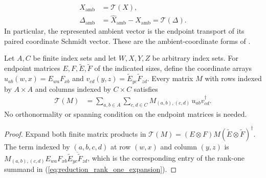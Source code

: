 \begin{definition}
\begin{align}
        X_{\mathrm{amb}} & =\mathcal T(X),
        \label{eq:reduction_ambient_exact}                                                      \\
        \Delta_{\mathrm{amb}}
                         & =\widehat X_{\mathrm{amb}}-X_{\mathrm{amb}}=\mathcal T(\Delta).
        \label{eq:reduction_ambient_correction}
    \end{align}
    In particular, the represented ambient vector is the endpoint
    transport of its paired coordinate Schmidt vector.
    These are the ambient-coordinate forms of
    \cite[Equation~(5.6)]{OpenAI2026PolynomialPEPS}.
\end{definition}

\begin{theorem}
    \label{thm:reduction_transport_rank_one}
    \leanok
    Let $A,C$ be finite index sets and let $W,X,Y,Z$ be arbitrary index sets.
    For endpoint matrices $E,F,\widetilde E,\widetilde F$ of the indicated
    sizes, define the coordinate arrays
    $u_{ab}(w,x)=E_{wa}F_{xb}$ and
    $v_{cd}(y,z)=\widetilde E_{yc}\widetilde F_{zd}$.
    Every matrix $M$ with rows indexed by $A\times A$ and columns indexed
    by $C\times C$ satisfies
    \begin{align}
        \mathcal T(M)
         & =\sum_{a,b\in A}\sum_{c,d\in C} M_{(a,b),(c,d)}\,u_{ab}v_{cd}^{\dagger}.
        \label{eq:reduction_rank_one_expansion}
    \end{align}
    No orthonormality or spanning condition on the endpoint matrices is needed.
\end{theorem}

\begin{proof}\leanok
    Expand both finite matrix products in
    $\mathcal T(M)=(E\otimes F)M(\widetilde E\otimes\widetilde F)^{\dagger}$.
    The term indexed by $(a,b,c,d)$ at row $(w,x)$ and column $(y,z)$ is
    $M_{(a,b),(c,d)}E_{wa}F_{xb}
        \overline{\widetilde E_{yc}\widetilde F_{zd}}$, which is the corresponding
    entry of the rank-one summand in (\ref{eq:reduction_rank_one_expansion}).
\end{proof}

